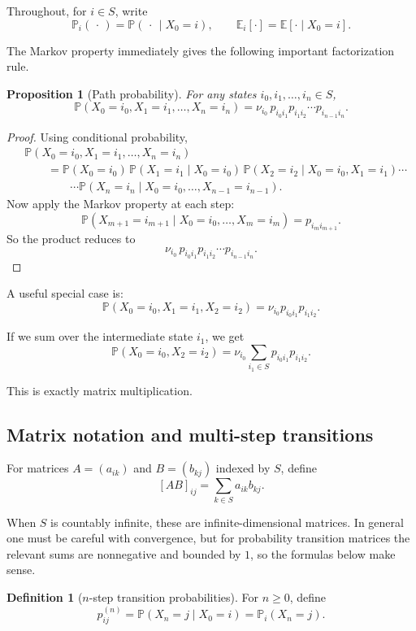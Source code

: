 \documentclass[11pt]{article}
\newtheorem{proposition}[theorem]{Proposition}
\theoremstyle{definition}
\newtheorem{definition}[theorem]{Definition}
\begin{document}
Throughout, for \(i\in S\), write
\[
\mathbb P_i(\,\cdot\,)=\mathbb P(\,\cdot\,\mid X_0=i),
\qquad
\mathbb E_i[\cdot]=\mathbb E[\cdot\mid X_0=i].
\]

The Markov property immediately gives the following important factorization rule.

\begin{proposition}[Path probability]
For any states \(i_0,i_1,\dots,i_n\in S\),
\[
\mathbb P(X_0=i_0,X_1=i_1,\dots,X_n=i_n)
=
\nu_{i_0}\,p_{i_0i_1}p_{i_1i_2}\cdots p_{i_{n-1}i_n}.
\]
\end{proposition}

\begin{proof}
Using conditional probability,
\begin{align*}
&\mathbb P(X_0=i_0,X_1=i_1,\dots,X_n=i_n) \\
&\qquad =
\mathbb P(X_0=i_0)\,
\mathbb P(X_1=i_1\mid X_0=i_0)\,
\mathbb P(X_2=i_2\mid X_0=i_0,X_1=i_1)\cdots \\
&\qquad\qquad \cdots
\mathbb P(X_n=i_n\mid X_0=i_0,\dots,X_{n-1}=i_{n-1}).
\end{align*}
Now apply the Markov property at each step:
\[
\mathbb P(X_{m+1}=i_{m+1}\mid X_0=i_0,\dots,X_m=i_m)=p_{i_m i_{m+1}}.
\]
So the product reduces to
\[
\nu_{i_0}\,p_{i_0i_1}p_{i_1i_2}\cdots p_{i_{n-1}i_n}.
\]
\end{proof}

A useful special case is:
\[
\mathbb P(X_0=i_0,X_1=i_1,X_2=i_2)=\nu_{i_0}p_{i_0i_1}p_{i_1i_2}.
\]

If we sum over the intermediate state \(i_1\), we get
\[
\mathbb P(X_0=i_0,X_2=i_2)
=
\nu_{i_0}\sum_{i_1\in S}p_{i_0i_1}p_{i_1i_2}.
\]

This is exactly matrix multiplication.

\subsection{Matrix notation and multi-step transitions}

For matrices \(A=(a_{ik})\) and \(B=(b_{kj})\) indexed by \(S\), define
\[
[AB]_{ij}=\sum_{k\in S} a_{ik}b_{kj}.
\]

When \(S\) is countably infinite, these are infinite-dimensional matrices. In general one must be careful with convergence, but for probability transition matrices the relevant sums are nonnegative and bounded by \(1\), so the formulas below make sense.

\begin{definition}[\(n\)-step transition probabilities]
For \(n\ge 0\), define
\[
p_{ij}^{(n)}=\mathbb P(X_n=j\mid X_0=i)=\mathbb P_i(X_n=j).
\]
\end{definition}
\end{document}
